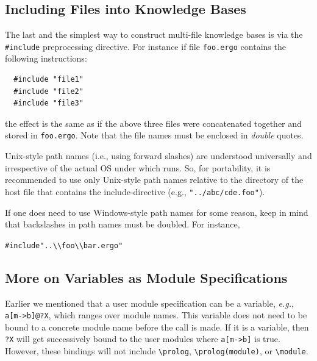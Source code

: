 \documentclass[11pt]{article}
\newcommand{\ERGO}{\mbox{\smaller{\ensuremath{\cal{E}}\smaller{{\sc{RGO}}}}}\xspace}
\newcommand{\FLSYSTEM}{\ERGO}
\newcommand{\ergoext}{ergo\xspace}
\newcommand{\bs}{\textbackslash}
\begin{document}
\subsection{Including Files into \FLSYSTEM Knowledge Bases}

The last and the simplest way to construct multi-file \FLSYSTEM 
knowledge bases is via the {\tt \#include} preprocessing directive.
For instance if file {\tt foo.\ergoext} contains the following instructions:
\begin{verbatim}
  #include "file1" 
  #include "file2"
  #include "file3"
\end{verbatim}
the effect is the same as if the above three files were concatenated
together and stored in {\tt foo.\ergoext}. Note that the file names must be
enclosed in \emph{double} quotes.

Unix-style path names (i.e., using forward slashes)
are understood universally and irrespective of the
actual OS under which \FLSYSTEM runs. So, for portability, it is
recommended to use only Unix-style path names relative to the directory of
the host file that contains the include-directive (e.g.,
\texttt{"../abc/cde.foo"}). 

If one does need to use Windows-style path names for some reason, keep in
mind that backslashes in path names must be doubled. For instance, 
\begin{alltt}
  #include "..\bs{}\bs{}foo\bs{}\bs{}bar.\ergoext"  
\end{alltt}

\subsection{More on Variables as Module Specifications}

Earlier we mentioned that a user module specification can be a variable,
{\it e.g.}, {\tt a[m->b]@?X}, which ranges over module names. This variable
does not need to be bound to a concrete module name before the call is
made.  If it is a variable, then {\tt ?X} will get successively bound to the
user modules where {\tt a[m->b]} is true.  However, these bindings will not
include {\tt \bs{}prolog}, {\tt \bs{}prolog(module)}, or {\tt \bs{}module}.
\end{document}
